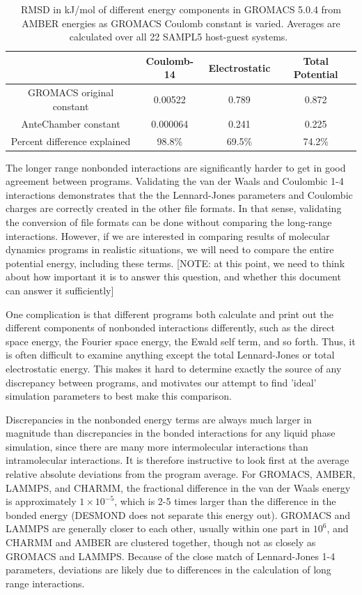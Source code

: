 \begin{table}
\caption{RMSD in kJ/mol of different energy components in GROMACS
  5.0.4 from AMBER energies as GROMACS Coulomb constant is
  varied. Averages are calculated over all 22 SAMPL5 host-guest
  systems.~\label{table:coulchange}}
\begin{tabular}{|c|ccc|}
\hline
                          & Coulomb-14  & Electrostatic & Total Potential \\
\hline
GROMACS original constant &  0.00522    & 0.789         & 0.872  \\ 
AnteChamber constant      &  0.000064   & 0.241         & 0.225 \\
Percent difference explained & 98.8\%   & 69.5\%        & 74.2\% \\  
\hline
\end{tabular}
\end{table}

The longer range nonbonded interactions are significantly harder to
get in good agreement between programs.  Validating the van der Waals
and Coulombic 1-4 interactions demonstrates that the the Lennard-Jones
parameters and Coulombic charges are correctly created in the other
file formats.  In that sense, validating the conversion of file
formats can be done without comparing the long-range
interactions. However, if we are interested in comparing results of
molecular dynamics programs in realistic situations, we will need to
compare the entire potential energy, including these terms. [NOTE: at
  this point, we need to think about how important it is to answer
  this question, and whether this document can answer it sufficiently]

One complication is that different programs both calculate and print
out the different components of nonbonded interactions differently,
such as the direct space energy, the Fourier space energy, the Ewald
self term, and so forth.  Thus, it is often difficult to examine
anything except the total Lennard-Jones or total electrostatic
energy. This makes it hard to determine exactly the source of any
discrepancy between programs, and motivates our attempt to find
'ideal' simulation parameters to best make this comparison.

Discrepancies in the nonbonded energy terms are always much larger in
magnitude than discrepancies in the bonded interactions for any liquid
phase simulation, since there are many more intermolecular
interactions than intramolecular interactions.  It is therefore
instructive to look first at the average relative absolute deviations
from the program average. For GROMACS, AMBER, LAMMPS, and CHARMM, the
fractional difference in the van der Waals energy is approximately
$1\times 10^{-5}$, which is 2-5 times larger than the difference in
the bonded energy (DESMOND does not separate this energy out). GROMACS
and LAMMPS are generally closer to each other, usually within one part
in $10^6$, and CHARMM and AMBER are clustered together, though not as
closely as GROMACS and LAMMPS. Because of the close match of
Lennard-Jones 1-4 parameters, deviations are likely due to differences
in the calculation of long range interactions.

